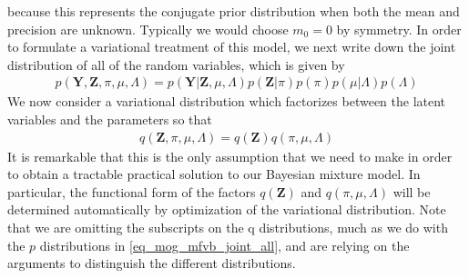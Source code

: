 \documentclass[10pt ]{article}
\begin{document}
because this represents the conjugate prior distribution when both the mean and precision are unknown. Typically we would choose $m_0 = 0$ by symmetry. In order to formulate a variational treatment of this model, we next write down the joint distribution of all of the random variables, which is given by
\begin{align}
p(\mathbf{Y}, \mathbf{Z}, \pi, \mu, \Lambda) = p(\mathbf{Y}|\mathbf{Z}, \mu, \Lambda)p(\mathbf{Z}|\pi) p(\pi) p(\mu | \Lambda) p (\Lambda) 
\label{eq_mog_mfvb_joint_all}
\end{align}
We now consider a variational distribution which factorizes between the latent variables and the parameters so that
\begin{align}
q(\mathbf{Z}, \pi, \mu, \Lambda) = q(\mathbf{Z}) q(\pi, \mu, \Lambda) 
\label{eq_mog_q_def}
\end{align}
It is remarkable that this is the only assumption that we need to make in order to obtain a tractable practical solution to our Bayesian mixture model. In particular, the functional form of the factors $ q(\mathbf{Z}) $ and $ q(\pi, \mu, \Lambda) $ will be determined automatically by optimization of the variational distribution. Note that we are omitting the subscripts on the q distributions, much as we do with the $p$ distributions in \eqref{eq_mog_mfvb_joint_all}, and are relying on the arguments to distinguish the different distributions.
\end{document}
